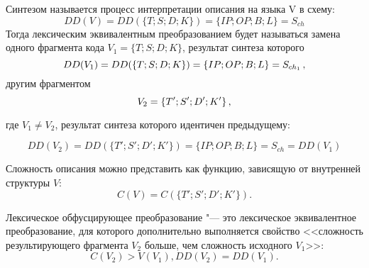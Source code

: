 Синтезом называется процесс интерпретации описания на языка V в схему:
\begin{equation}
  DD(V) = DD(\{T;S;D;K\}) = \{IP;OP;B;L\} = S_{ch}
  \label{eq:domain:lexical:synthesis}
\end{equation}
Тогда лексическим эквивалентным преобразованием будет называться замена одного фрагмента кода $V_1 = \{T;S;D;K\}$, результат синтеза которого
\begin{equation}
  DD(V_1) = DD(\{T;S;D;K\}) = \{IP;OP;B;L\} = S_{ch_1}\text{\,,}
  \label{eq:domain:lexical:equantinal_transform}
\end{equation}
другим фрагментом
\begin{equation}
  V_2 = \{T';S';D';K'\} \text{\,,}
  \label{eq:domain:lexical:equation_second}
\end{equation}
\begin{explanation}
  где $V_1 \neq V_2$, результат синтеза которого идентичен предыдущему:
\end{explanation}
\begin{equation}
  DD(V_2) = DD(\{T';S';D';K'\}) = \{IP;OP;B;L\} = S_{ch} = DD(V_1)
  \label{eq:domain:lexical:final_synth_equation}
\end{equation}

Сложность описания можно представить как функцию, зависящую от внутренней структуры $V$:
\begin{equation}
  C(V) = C(\{T';S';D';K'\}).
  \label{eq:domain:lexical:final_synth_equation}
\end{equation}

Лексическое обфусцирующее преобразование "--- это лексическое эквивалентное преобразование, для которого дополнительно выполняется свойство <<сложность результирующего фрагмента $V_2$ больше, чем сложность исходного $V_1$>>:
\begin{equation}
  C(V_2) > V(V_1), DD(V_2) = DD(V_1).
  \label{eq:domain:lexical:final_synth_equation}
\end{equation}
